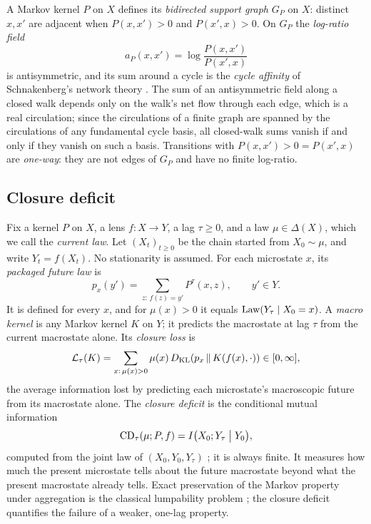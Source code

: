 A Markov kernel $P$ on $X$ defines its \emph{bidirected support graph} $G_P$ on $X$: distinct $x,x'$ are adjacent when $P(x,x')>0$ and $P(x',x)>0$.
On $G_P$ the \emph{log-ratio field}
\[
  a_P(x,x')=\log\frac{P(x,x')}{P(x',x)}
\]
is antisymmetric, and its sum around a cycle is the \emph{cycle affinity} of Schnakenberg's network theory \citep{Schnakenberg1976}.
The sum of an antisymmetric field along a closed walk depends only on the walk's net flow through each edge, which is a real circulation; since the circulations of a finite graph are spanned by the circulations of any fundamental cycle basis, all closed-walk sums vanish if and only if they vanish on such a basis.
Transitions with $P(x,x')>0=P(x',x)$ are \emph{one-way}: they are not edges of $G_P$ and have no finite log-ratio.

\subsection{Closure deficit}
Fix a kernel $P$ on $X$, a lens $f:X\to Y$, a lag $\tau\ge 0$, and a law $\mu\in\Delta(X)$, which we call the \emph{current law}.
Let $(X_t)_{t\ge 0}$ be the chain started from $X_0\sim\mu$, and write $Y_t=f(X_t)$.
No stationarity is assumed.
For each microstate $x$, its \emph{packaged future law} is
\[
  p_x(y')=\sum_{z:\,f(z)=y'}P^{\tau}(x,z),\qquad y'\in Y.
\]
It is defined for every $x$, and for $\mu(x)>0$ it equals $\mathrm{Law}(Y_\tau\mid X_0=x)$.
A \emph{macro kernel} is any Markov kernel $K$ on $Y$; it predicts the macrostate at lag $\tau$ from the current macrostate alone.
Its \emph{closure loss} is
\[
  \mathcal{L}_\tau(K)=\sum_{x:\,\mu(x)>0}\mu(x)\,D_{\mathrm{KL}}\!\left(p_x\,\middle\|\,K(f(x),\cdot)\right)\in[0,\infty],
\]
the average information lost by predicting each microstate's macroscopic future from its macrostate alone.
The \emph{closure deficit} is the conditional mutual information
\[
  \mathrm{CD}_\tau(\mu;P,f)=I\bigl(X_0;Y_\tau\bigm| Y_0\bigr),
\]
computed from the joint law of $(X_0,Y_0,Y_\tau)$ \citep{CoverThomas2006}; it is always finite.
It measures how much the present microstate tells about the future macrostate beyond what the present macrostate already tells.
Exact preservation of the Markov property under aggregation is the classical lumpability problem \citep{KemenySnell1960,Buchholz1994}; the closure deficit quantifies the failure of a weaker, one-lag property.

